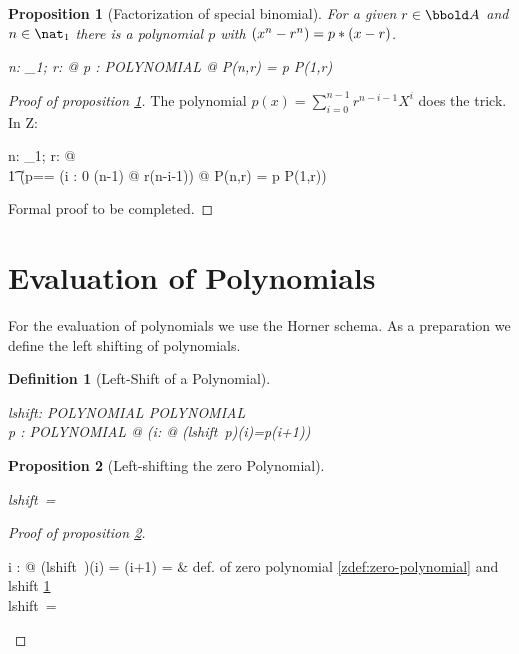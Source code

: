\documentclass[12pt]{scrartcl}
\newtheorem{prop}{Proposition}[section]
\newtheorem{zdef}{Definition}[section]
\begin{document}
\begin{prop}[Factorization of special binomial]
  \label{prop:factorization-binomial}
  For a given $r \in \arithmos$ and $n \in \nat_1$ there is a polynomial
  $p$ with $(x^n-r^n) = p * (x - r)$.
  \begin{zed}
    \forall n: \nat_1; r: \arithmos @ \exists p : POLYNOMIAL @ P(n,r) = p
    \polymult P(1,r)
  \end{zed}
\end{prop}

\begin{proof}[Proof of proposition \ref{prop:factorization-binomial}]
  The polynomial $p(x) = \sum_{i=0}^{n-1}r^{n-i-1}X^i$ does the
  trick. In Z:
  \begin{zed}
    \forall n: \nat_1; r: \arithmos @ \\
    \t1 (\LET p==\zeropol \oplus 
    (\lambda i : 0 \upto (n-1) @ r\apwr(n-i-1)) @ P(n,r) = p
    \polymult P(1,r))
  \end{zed}
  Formal proof to be completed.
\end{proof}

\section{Evaluation of Polynomials}
\label{sec:evaluation}

For the evaluation of polynomials we use the Horner schema. As a
preparation we define the left shifting of polynomials.
 
\begin{zdef}[Left-Shift of a Polynomial]
  \label{zdef:left-shift}
  \begin{axdef}
    lshift: POLYNOMIAL \fun POLYNOMIAL \\
    \where
    \forall p : POLYNOMIAL @ (\forall i: \nat @ (lshift~p)(i)=p(i+1))
  \end{axdef}
\end{zdef}

\begin{prop}[Left-shifting the zero Polynomial]
  \label{prop:left-shift-zero-polynomial}
  \begin{zed}
    lshift~\zeropol = \zeropol
  \end{zed}
\end{prop}

\begin{proof}[Proof of proposition
  \ref{prop:left-shift-zero-polynomial}]
  \begin{argue}
    \forall i : \nat @ (lshift~\zeropol)(i) = \zeropol(i+1) = \azero &
    def. of zero polynomial  \ref{zdef:zero-polynomial} and
    lshift \ref{zdef:left-shift}\\
    \vdash lshift~\zeropol = \zeropol \\
  \end{argue}
  
\end{proof}
\end{document}
